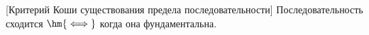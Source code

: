 [Критерий Коши существования предела последовательности]\label{KKKK}
    Последовательность сходится $\hm{\iff}$ когда она фундаментальна.
